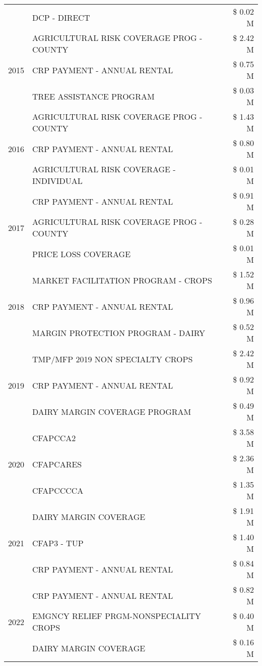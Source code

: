 \begin{tabular}{llr}
 & DCP - DIRECT & \$ 0.02 M \\
\cline{1-3}
\multirow[t]{3}{*}{2015} & AGRICULTURAL RISK COVERAGE PROG - COUNTY & \$ 2.42 M \\
 & CRP PAYMENT - ANNUAL RENTAL & \$ 0.75 M \\
 & TREE ASSISTANCE PROGRAM & \$ 0.03 M \\
\cline{1-3}
\multirow[t]{3}{*}{2016} & AGRICULTURAL RISK COVERAGE PROG - COUNTY & \$ 1.43 M \\
 & CRP PAYMENT - ANNUAL RENTAL & \$ 0.80 M \\
 & AGRICULTURAL RISK COVERAGE - INDIVIDUAL & \$ 0.01 M \\
\cline{1-3}
\multirow[t]{3}{*}{2017} & CRP PAYMENT - ANNUAL RENTAL & \$ 0.91 M \\
 & AGRICULTURAL RISK COVERAGE PROG - COUNTY & \$ 0.28 M \\
 & PRICE LOSS COVERAGE & \$ 0.01 M \\
\cline{1-3}
\multirow[t]{3}{*}{2018} & MARKET FACILITATION PROGRAM - CROPS & \$ 1.52 M \\
 & CRP PAYMENT - ANNUAL RENTAL & \$ 0.96 M \\
 & MARGIN PROTECTION PROGRAM - DAIRY & \$ 0.52 M \\
\cline{1-3}
\multirow[t]{3}{*}{2019} & TMP/MFP 2019 NON SPECIALTY CROPS & \$ 2.42 M \\
 & CRP PAYMENT - ANNUAL RENTAL & \$ 0.92 M \\
 & DAIRY MARGIN COVERAGE PROGRAM & \$ 0.49 M \\
\cline{1-3}
\multirow[t]{3}{*}{2020} & CFAPCCA2 & \$ 3.58 M \\
 & CFAPCARES & \$ 2.36 M \\
 & CFAPCCCCA & \$ 1.35 M \\
\cline{1-3}
\multirow[t]{3}{*}{2021} & DAIRY MARGIN COVERAGE & \$ 1.91 M \\
 & CFAP3 - TUP & \$ 1.40 M \\
 & CRP PAYMENT - ANNUAL RENTAL & \$ 0.84 M \\
\cline{1-3}
\multirow[t]{3}{*}{2022} & CRP PAYMENT - ANNUAL RENTAL & \$ 0.82 M \\
 & EMGNCY RELIEF PRGM-NONSPECIALITY CROPS & \$ 0.40 M \\
 & DAIRY MARGIN COVERAGE & \$ 0.16 M \\
\cline{1-3}
\bottomrule
\end{tabular}
